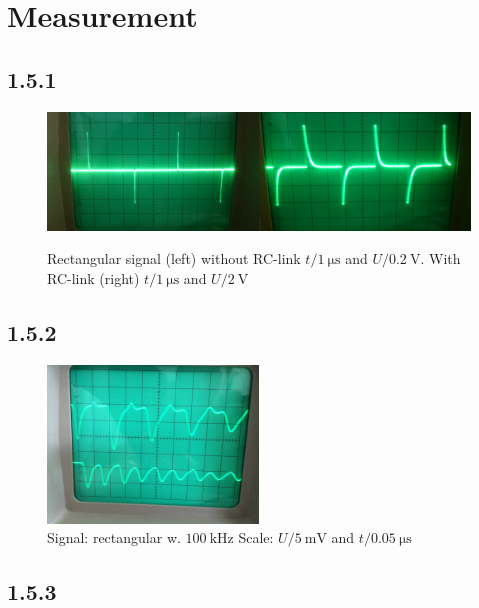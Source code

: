 \section{Measurement}
\subsection{1.5.1}
\begin{figure}[h]
	\centering
	\includegraphics[width=0.5\textwidth]{r_eck_ohne}\includegraphics[width=0.5\textwidth]{r_eck_mit}\caption{Rectangular signal (left) without RC-link $t/\SI{1}{\micro\s}$ and $U/\SI{0.2}{\volt}$. With RC-link (right) $t/\SI{1}{\micro\s}$ and $U/\SI{2}{\volt}$}
\end{figure}
\subsection{1.5.2}
\begin{figure}[h]
	\centering
	\includegraphics[width=0.5\textwidth]{152}
	\caption{Signal: rectangular w. $\SI{100}{\kilo\hertz}$ Scale: $U/\SI{5}{\milli\volt}$ and $t/\SI{0.05}{\micro\s}$}
\end{figure}
\newpage
\subsection{1.5.3}
